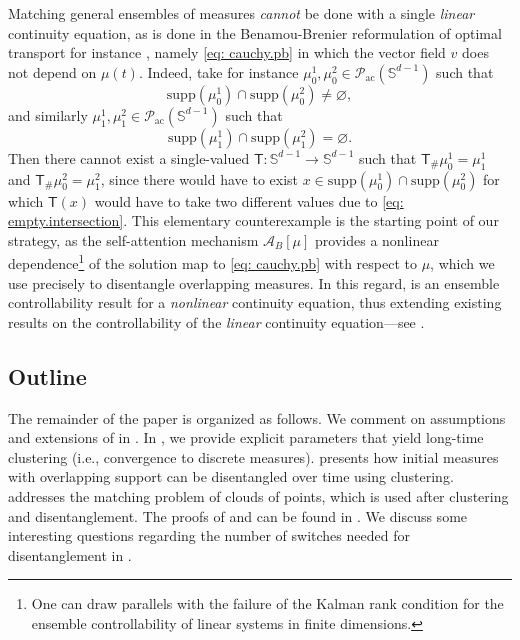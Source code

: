 \documentclass[a4paper,11pt]{article}
\theoremstyle{plain}
\newcommand{\supp}{\mathrm{supp}}
\renewcommand{\S}{\mathbb{S}^{d-1}}
\newcommand{\bB}{\bm{\mathit{B}}}
\numberwithin{equation}{section}
\begin{document}
Matching general ensembles of measures \emph{cannot} be done with a single \emph{linear} continuity equation, as is done in the Benamou-Brenier reformulation of optimal transport for instance \cite{benamou2000computational}, namely \eqref{eq: cauchy.pb} in which the vector field $v$ does not depend on $\mu(t)$. Indeed, take for instance $\mu_0^1,\mu_0^2\in\mathscr{P}_{\mathrm{ac}}(\S)$ such that 
$$\supp(\mu_0^1)\cap \supp(\mu_0^2)\neq\varnothing,$$
and similarly $\mu_1^1,\mu_1^2\in \mathscr{P}_{\mathrm{ac}}(\S)$ such that
\begin{equation} \label{eq: empty.intersection}
\supp(\mu_1^1)\cap \supp(\mu_1^2)=\varnothing.
\end{equation}
Then there cannot exist a single-valued $\mathsf{T}:\S\to\S$ such that $\mathsf{T}_\#\mu_0^1=\mu_1^1$ and $\mathsf{T}_\#\mu_0^2=\mu_1^2$, since there would have to exist $x\in \supp(\mu_0^1)\cap \supp(\mu_0^2)$ for which $\mathsf{T}(x)$ would have to take two different values due to \eqref{eq: empty.intersection}. This elementary counterexample is the starting point of our strategy, as the self-attention mechanism $\mathscr{A}_{\bB}[\mu]$ provides a nonlinear dependence\footnote{One can draw parallels with the failure of the Kalman rank condition \cite{sontag2013mathematical, coron2007control} for the ensemble controllability of linear systems in finite dimensions.} of the solution map to \eqref{eq: cauchy.pb} with respect to $\mu$, which we use precisely to disentangle overlapping measures. In this regard,  is an ensemble controllability result for a {\it nonlinear} continuity equation, thus extending existing results on the controllability of the {\it linear} continuity equation---see \cite{brockett2008control, khesin2009, agrachev2009controllability, agrachev2009optimal, raginsky2024some, chen2016optimal, duprez2019approximate}.

\subsection{Outline} The remainder of the paper is organized as follows. We comment on assumptions and extensions of  in {\bf {}}. In {\bf {}}, we provide explicit parameters that yield long-time clustering (i.e., convergence to discrete measures). {\bf {}} presents how initial measures with overlapping support can be disentangled over time using clustering. {\bf {}} addresses the matching problem of clouds of points, which is used after clustering and disentanglement. The proofs of  and  can be found in {\bf {}}. We discuss some interesting questions regarding the number of switches needed for disentanglement in {\bf {}}.
\end{document}
